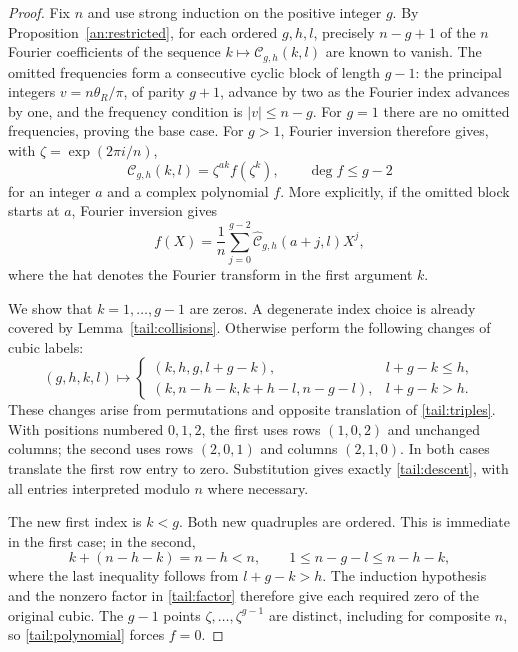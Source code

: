 \begin{proof}
Fix $n$ and use strong induction on the positive integer $g$. By
Proposition~\ref{an:restricted}, for each ordered $g,h,l$, precisely
$n-g+1$ of the $n$ Fourier coefficients of the sequence
$k\mapsto\mathcal C_{g,h}(k,l)$ are known to vanish.
The omitted frequencies form a consecutive cyclic block of
length $g-1$: the principal integers $v=n\theta_R/\pi$,
of parity $g+1$, advance by two as the Fourier index advances
by one, and the frequency condition is $|v|\le n-g$.
For $g=1$ there are no omitted frequencies, proving the base case.
For $g>1$, Fourier inversion therefore gives, with
$\zeta=\exp(2\pi i/n)$,
\begin{equation}\label{tail:polynomial}
 \mathcal C_{g,h}(k,l)=\zeta^{ak}f(\zeta^k),\qquad
                         \deg f\le g-2
\end{equation}
for an integer $a$ and a complex polynomial $f$.
More explicitly, if the omitted block starts at $a$, Fourier inversion
gives
\[
 f(X)=\frac1n\sum_{j=0}^{g-2}
          \widehat{\mathcal C}_{g,h}(a+j,l)X^j,
\]
where the hat denotes the Fourier transform in the first argument $k$.

We show that $k=1,\ldots,g-1$ are zeros.  A degenerate index choice is
already covered by Lemma~\ref{tail:collisions}.  Otherwise
perform the following changes of cubic labels:
\begin{equation}\label{tail:descent}
 (g,h,k,l)\longmapsto
 \begin{cases}
 (k,h,g,l+g-k),&l+g-k\le h,\\
 (k,n-h-k,k+h-l,n-g-l),&l+g-k>h.
 \end{cases}
\end{equation}
These changes arise from permutations and opposite translation
of \eqref{tail:triples}.  With positions numbered $0,1,2$,
the first uses rows $(1,0,2)$ and unchanged columns; the second
uses rows $(2,0,1)$ and columns $(2,1,0)$.  In both cases
translate the first row entry to zero.  Substitution gives
exactly \eqref{tail:descent}, with all entries interpreted
modulo $n$ where necessary.

The new first index is $k<g$.  Both new quadruples are ordered.
This is immediate in the first case; in the second,
\[
 k+(n-h-k)=n-h<n,\qquad
 1\le n-g-l\le n-h-k,
\]
where the last inequality follows from $l+g-k>h$.
The induction hypothesis and the nonzero factor in
\eqref{tail:factor} therefore give each required zero of the
original cubic.  The $g-1$ points
$\zeta,\ldots,\zeta^{g-1}$ are distinct, including for
composite $n$, so \eqref{tail:polynomial} forces $f=0$.
\end{proof}

